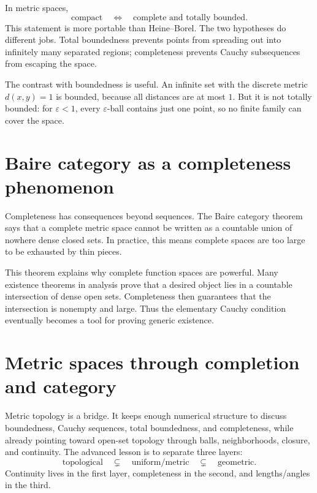 In metric spaces,
\[
  \text{compact}\quad\Longleftrightarrow\quad \text{complete and totally bounded}.
\]
This statement is more portable than Heine--Borel.  The two hypotheses do different jobs.  Total boundedness prevents points from spreading out into infinitely many separated regions; completeness prevents Cauchy subsequences from escaping the space.

The contrast with boundedness is useful.  An infinite set with the discrete metric \(d(x,y)=1\) is bounded, because all distances are at most \(1\).  But it is not totally bounded: for \(\varepsilon<1\), every \(\varepsilon\)-ball contains just one point, so no finite family can cover the space.

\section{Baire category as a completeness phenomenon}

Completeness has consequences beyond sequences.  The Baire category theorem says that a complete metric space cannot be written as a countable union of nowhere dense closed sets.  In practice, this means complete spaces are too large to be exhausted by thin pieces.

This theorem explains why complete function spaces are powerful.  Many existence theorems in analysis prove that a desired object lies in a countable intersection of dense open sets.  Completeness then guarantees that the intersection is nonempty and large.  Thus the elementary Cauchy condition eventually becomes a tool for proving generic existence.

\section{Metric spaces through completion and category}

Metric topology is a bridge.  It keeps enough numerical structure to discuss boundedness, Cauchy sequences, total boundedness, and completeness, while already pointing toward open-set topology through balls, neighborhoods, closure, and continuity.  The advanced lesson is to separate three layers:
\[
  \text{topological}\quad\subsetneq\quad \text{uniform/metric}\quad\subsetneq\quad \text{geometric}.
\]
Continuity lives in the first layer, completeness in the second, and lengths/angles in the third.
